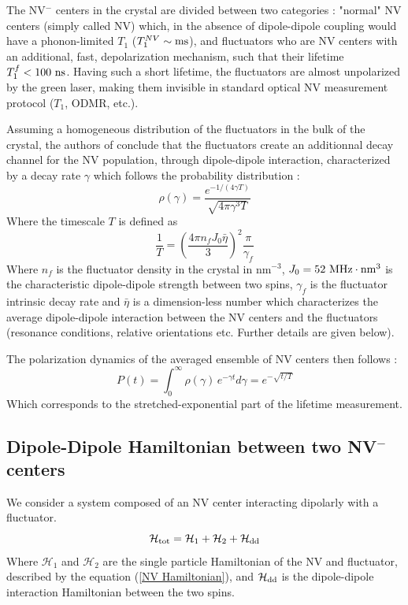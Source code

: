 \documentclass[preprintnumbers,amsmath,amssymb,onecolumn,12pt]{revtex4-2}\usepackage{graphicx}%
\begin{document}
The NV$^-$ centers in the crystal are divided between two categories : "normal" NV centers (simply called NV) which, in the absence of dipole-dipole coupling would have a phonon-limited $T_1$ ($T_1^{NV}\sim \rm ms$), and fluctuators who are NV centers with an additional, fast, depolarization mechanism, such that their lifetime $T_1^f < 100\ \rm ns$. Having such a short lifetime, the fluctuators are almost unpolarized by the green laser, making them invisible in standard optical NV measurement protocol ($T_1$, ODMR, etc.). 

Assuming a homogeneous distribution of the fluctuators in the bulk of the crystal, the authors of \cite{choi_depolarization_2017} conclude that the fluctuators create an additionnal decay channel for the NV population, through dipole-dipole interaction, characterized by a decay rate $\gamma$ which follows the probability distribution :
\begin{equation}
\rho(\gamma)=\frac{e^{-1/(4\gamma T)}}{\sqrt{4\pi \gamma^3 T}}
\end{equation}
Where the timescale $T$ is defined as
\begin{equation}
\frac{1}{T}=\left(\frac{4\pi n_fJ_0\bar \eta}{3}\right)^2 \frac{\pi}{\gamma_f}
\label{eq 1/T}
\end{equation}
Where $n_f$ is the fluctuator density in the crystal in nm$^{-3}$, $J_0=52\ \rm{MHz}\cdot\rm{nm}^3$ is the characteristic dipole-dipole strength between two spins, $\gamma_f$ is the fluctuator intrinsic decay rate and $\bar \eta$ is a dimension-less number which characterizes the average dipole-dipole interaction between the NV centers and the fluctuators (resonance conditions, relative orientations etc. Further details are given below).

The polarization dynamics of the averaged ensemble of NV centers then follows :
\begin{equation}
P(t)=\int_0^\infty \rho(\gamma)\, e^{-\gamma t}d\gamma= e^{-\sqrt{t/T}}
\end{equation}
Which corresponds to the stretched-exponential part of the lifetime measurement.
\subsection{Dipole-Dipole Hamiltonian between two NV$^-$ centers}
We consider a system composed of an NV center interacting dipolarly with a fluctuator.
\begin{equation}
\mathcal{H}_{\rm tot}=\mathcal{H}_{1}+\mathcal{H}_2+\mathcal{H}_{\rm dd}
\end{equation}
Where $\mathcal{H}_{1}$ and $\mathcal{H}_{2}$ are the single particle Hamiltonian of the NV and fluctuator, described by the equation (\ref{NV Hamiltonian}), and $\mathcal{H}_{\rm dd}$ is the dipole-dipole interaction Hamiltonian between the two spins. 
\end{document}
